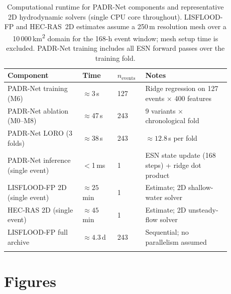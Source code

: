 \documentclass[pdflatex,sn-mathphys-ay]{sn-jnl}
\theoremstyle{thmstyleone}
\begin{document}
\begin{table}[p]
\centering
\small
\caption{Computational runtime for PADR-Net components and representative 2D hydrodynamic solvers
  (single CPU core throughout).  LISFLOOD-FP and HEC-RAS~2D estimates assume a 250\,m resolution
  mesh over a 10\,000\,km\textsuperscript{2} domain for the 168-h event window; mesh setup time
  is excluded.  PADR-Net training includes all ESN forward passes over the training fold.}
\label{tab:runtime_comparison}
\begin{tabular}{p{0.30\linewidth}p{0.14\linewidth}p{0.10\linewidth}p{0.34\linewidth}}
\toprule
Component & Time & $n_{\mathrm{events}}$ & Notes \\
\midrule
PADR-Net training (M6) & $\approx$3\,s & 127 & Ridge regression on 127 events $\times$ 400 features \\
PADR-Net ablation (M0--M8) & $\approx$47\,s & 243 & 9 variants $\times$ chronological fold \\
PADR-Net LORO (3 folds) & $\approx$38\,s & 243 & ${\approx}12.8$\,s per fold \\
PADR-Net inference (single event) & $<$1\,ms & 1 & ESN state update (168 steps) + ridge dot product \\
\midrule
LISFLOOD-FP 2D (single event) & ${\approx}25$\,min & 1 & Estimate; 2D shallow-water solver \\
HEC-RAS 2D (single event) & ${\approx}45$\,min & 1 & Estimate; 2D unsteady-flow solver \\
LISFLOOD-FP full archive & ${\approx}4.3$\,d & 243 & Sequential; no parallelism assumed \\
\botrule
\end{tabular}
\end{table}

\clearpage
\section*{Figures}
\end{document}
